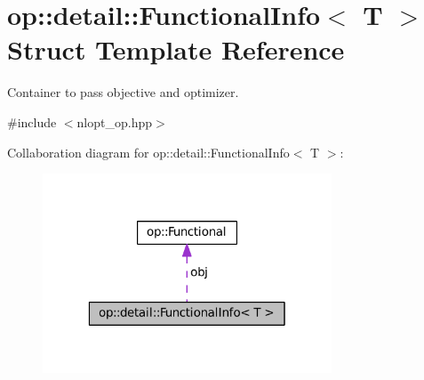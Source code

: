 \hypertarget{structop_1_1detail_1_1FunctionalInfo}{\section{op\-:\-:detail\-:\-:Functional\-Info$<$ T $>$ Struct Template Reference}
\label{structop_1_1detail_1_1FunctionalInfo}
}


Container to pass objective and optimizer.  




{\ttfamily \#include $<$nlopt\-\_\-op.\-hpp$>$}



Collaboration diagram for op\-:\-:detail\-:\-:Functional\-Info$<$ T $>$\-:
\nopagebreak
\begin{figure}[H]
\begin{center}
\leavevmode
\includegraphics[width=244pt]{structop_1_1detail_1_1FunctionalInfo__coll__graph}
\end{center}
\end{figure}
